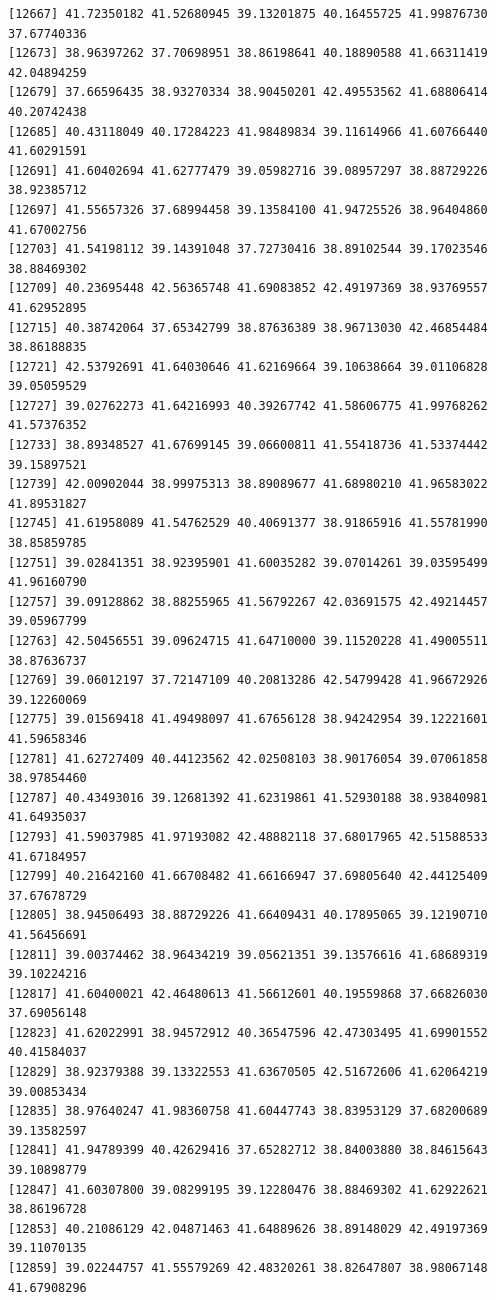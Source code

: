 \documentclass[
  letterpaper,
  DIV=11,
  numbers=noendperiod]{scrartcl}
\begin{document}
\begin{verbatim}
[12667] 41.72350182 41.52680945 39.13201875 40.16455725 41.99876730 37.67740336
[12673] 38.96397262 37.70698951 38.86198641 40.18890588 41.66311419 42.04894259
[12679] 37.66596435 38.93270334 38.90450201 42.49553562 41.68806414 40.20742438
[12685] 40.43118049 40.17284223 41.98489834 39.11614966 41.60766440 41.60291591
[12691] 41.60402694 41.62777479 39.05982716 39.08957297 38.88729226 38.92385712
[12697] 41.55657326 37.68994458 39.13584100 41.94725526 38.96404860 41.67002756
[12703] 41.54198112 39.14391048 37.72730416 38.89102544 39.17023546 38.88469302
[12709] 40.23695448 42.56365748 41.69083852 42.49197369 38.93769557 41.62952895
[12715] 40.38742064 37.65342799 38.87636389 38.96713030 42.46854484 38.86188835
[12721] 42.53792691 41.64030646 41.62169664 39.10638664 39.01106828 39.05059529
[12727] 39.02762273 41.64216993 40.39267742 41.58606775 41.99768262 41.57376352
[12733] 38.89348527 41.67699145 39.06600811 41.55418736 41.53374442 39.15897521
[12739] 42.00902044 38.99975313 38.89089677 41.68980210 41.96583022 41.89531827
[12745] 41.61958089 41.54762529 40.40691377 38.91865916 41.55781990 38.85859785
[12751] 39.02841351 38.92395901 41.60035282 39.07014261 39.03595499 41.96160790
[12757] 39.09128862 38.88255965 41.56792267 42.03691575 42.49214457 39.05967799
[12763] 42.50456551 39.09624715 41.64710000 39.11520228 41.49005511 38.87636737
[12769] 39.06012197 37.72147109 40.20813286 42.54799428 41.96672926 39.12260069
[12775] 39.01569418 41.49498097 41.67656128 38.94242954 39.12221601 41.59658346
[12781] 41.62727409 40.44123562 42.02508103 38.90176054 39.07061858 38.97854460
[12787] 40.43493016 39.12681392 41.62319861 41.52930188 38.93840981 41.64935037
[12793] 41.59037985 41.97193082 42.48882118 37.68017965 42.51588533 41.67184957
[12799] 40.21642160 41.66708482 41.66166947 37.69805640 42.44125409 37.67678729
[12805] 38.94506493 38.88729226 41.66409431 40.17895065 39.12190710 41.56456691
[12811] 39.00374462 38.96434219 39.05621351 39.13576616 41.68689319 39.10224216
[12817] 41.60400021 42.46480613 41.56612601 40.19559868 37.66826030 37.69056148
[12823] 41.62022991 38.94572912 40.36547596 42.47303495 41.69901552 40.41584037
[12829] 38.92379388 39.13322553 41.63670505 42.51672606 41.62064219 39.00853434
[12835] 38.97640247 41.98360758 41.60447743 38.83953129 37.68200689 39.13582597
[12841] 41.94789399 40.42629416 37.65282712 38.84003880 38.84615643 39.10898779
[12847] 41.60307800 39.08299195 39.12280476 38.88469302 41.62922621 38.86196728
[12853] 40.21086129 42.04871463 41.64889626 38.89148029 42.49197369 39.11070135
[12859] 39.02244757 41.55579269 42.48320261 38.82647807 38.98067148 41.67908296

\end{verbatim}
\end{document}
